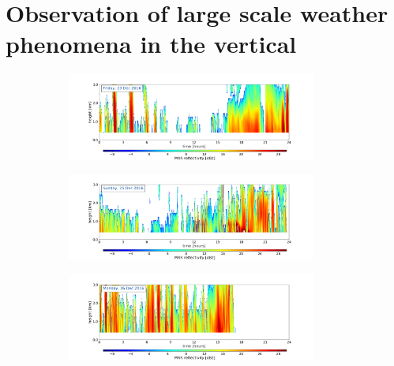 \section{Observation of large scale weather phenomena in the vertical}%
\label{sec:res:large_scale_vert}
\begin{figure}[h!]
	\centering
	\begin{subfigure}[t]{\textwidth}
		\centering
		\includegraphics[trim={4.cm 2.5cm 4.5cm 1.5cm},clip,width=0.9\textwidth]{./fig_MRR_refl/MRR_20161223}
		\caption{}\label{fig:ret:refl23}
	\end{subfigure}
	\begin{subfigure}[t]{\textwidth}
		\centering
		\includegraphics[trim={4.cm 2.5cm 4.5cm 1.5cm},clip,width=0.9\textwidth]{./fig_MRR_refl/MRR_20161225}
		\caption{}\label{fig:ret:refl25}
	\end{subfigure}
	\begin{subfigure}[t]{\textwidth}
		\centering
		\includegraphics[trim={4.cm 2.5cm 4.5cm 1.5cm},clip,width=0.9\textwidth]{./fig_MRR_refl/MRR_20161226}

\end{subfigure}
\end{figure}
